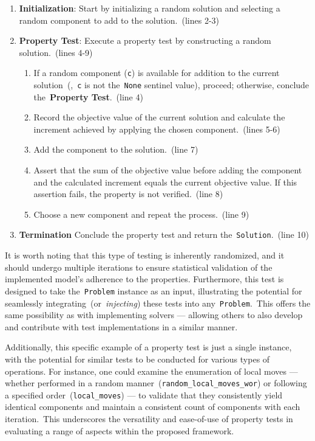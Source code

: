\begin{enumerate}
      \item \textbf{Initialization}: Start by initializing a random solution and selecting
            a random component to add to the solution.~(lines 2-3)
      \item \textbf{Property Test}: Execute a property test by constructing a random solution.~(lines 4-9)
            \begin{enumerate}
                  \item If a random component (\texttt{c}) is available for addition to the current
                        solution~(\ie{},~\texttt{c} is not the~\texttt{None} sentinel value),
                        proceed; otherwise, conclude the~\textbf{Property Test}.~(line 4)
                  \item Record the objective value of the current solution and calculate the increment
                        achieved by applying the chosen component.~(lines 5-6)
                  \item Add the component to the solution.~(line 7)
                  \item Assert that the sum of the objective value before adding the component and
                        the calculated increment equals the current objective value. If this assertion
                        fails, the property is not verified.~(line 8)
                  \item Choose a new component and repeat the process.~(line 9)
            \end{enumerate}
      \item \textbf{Termination} Conclude the property test and return the~\texttt{Solution}.~(line 10)
\end{enumerate}

It is worth noting that this type of testing is inherently randomized, and it
should undergo multiple iterations to ensure statistical validation of the
implemented model's adherence to the properties. Furthermore, this test is
designed to take the~\texttt{Problem} instance as an input, illustrating the
potential for seamlessly integrating~(or~\emph{injecting}) these tests into
any~\texttt{Problem}.~This offers the same possibility as with implementing solvers ---
allowing others to also develop and contribute with test implementations in a
similar manner.

Additionally, this specific example of a property test is just a single
instance, with the potential for similar tests to be conducted for various types
of operations. For instance, one could examine the enumeration of local moves ---
whether performed in a random manner~(\texttt{random\_local\_moves\_wor}) or
following a specified order~(\texttt{local\_moves}) --- to validate that they
consistently yield identical components and maintain a consistent count of
components with each iteration.~This underscores the versatility and ease-of-use
of property tests in evaluating a range of aspects within the proposed framework.